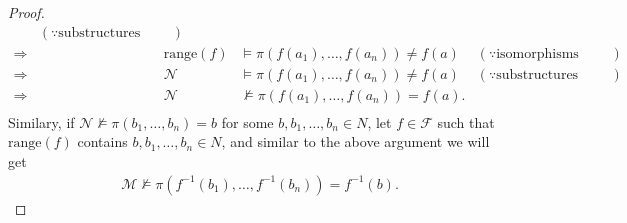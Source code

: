 \documentclass{article}
\begin{document}
\begin{enumerate}[label={\bf Q\arabic*:}]
\begin{proof}
\begin{align*}
                    & (\because\text{substructures preserve functions}) \\
        \Rightarrow && \text{range}(f)
                    & \models\pi(f(a_1),\ldots,f(a_n))\neq f(a)
                    & (\because\text{isomorphisms preserve functions}) \\
        \Rightarrow && \mathcal{N}
                    & \models\pi(f(a_1),\ldots,f(a_n))\neq f(a)
                    & (\because\text{substructures preserve functions}) \\
        \Rightarrow && \mathcal{N}
                    & \not\models\pi(f(a_1),\ldots,f(a_n))=f(a). & \\
      \end{align*}
      Similary, if $\mathcal{N}\not\models\pi(b_1,\ldots,b_n)=b$ for some
      $b,b_1,\ldots,b_n\in N$, let $f\in\mathcal{F}$ such that
      $\text{range}(f)$ contains $b,b_1,\ldots,b_n\in N$, and similar to
      the above argument we will get
      \begin{align*}
        \mathcal{M}\not\models\pi(f^{-1}(b_1),\ldots,f^{-1}(b_n))=f^{-1}(b).
      \end{align*}


\end{proof}
\end{enumerate}
\end{document}
